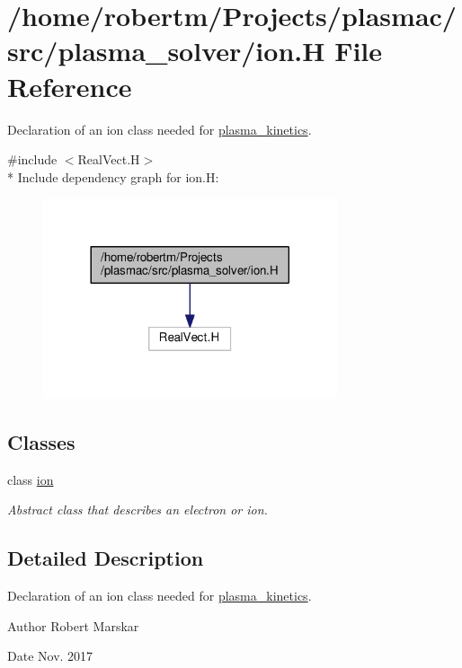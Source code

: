 \hypertarget{ion_8H}{}\section{/home/robertm/\+Projects/plasmac/src/plasma\+\_\+solver/ion.H File Reference}
\label{ion_8H}


Declaration of an ion class needed for \hyperlink{classplasma__kinetics}{plasma\+\_\+kinetics}.  


{\ttfamily \#include $<$Real\+Vect.\+H$>$}\\*
Include dependency graph for ion.\+H\+:\nopagebreak
\begin{figure}[H]
\begin{center}
\leavevmode
\includegraphics[width=245pt]{ion_8H__incl}
\end{center}
\end{figure}
\subsection*{Classes}
\begin{DoxyCompactItemize}
\item 
class \hyperlink{classion}{ion}
\begin{DoxyCompactList}\small\item\em Abstract class that describes an electron or ion. \end{DoxyCompactList}\end{DoxyCompactItemize}


\subsection{Detailed Description}
Declaration of an ion class needed for \hyperlink{classplasma__kinetics}{plasma\+\_\+kinetics}. 

\begin{DoxyAuthor}{Author}
Robert Marskar 
\end{DoxyAuthor}
\begin{DoxyDate}{Date}
Nov. 2017 
\end{DoxyDate}
